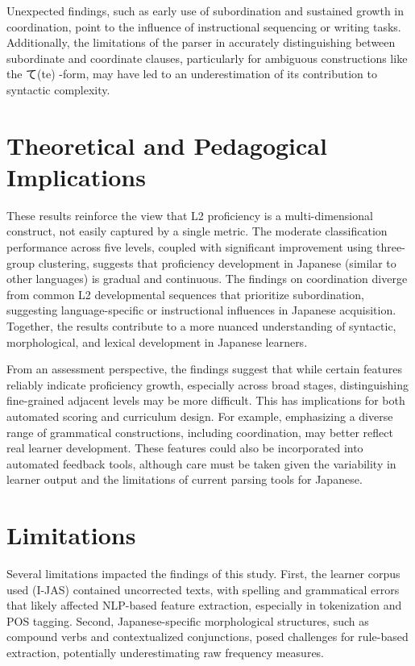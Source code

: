 Unexpected findings, such as early use of subordination and sustained growth in coordination, point to the influence
of instructional sequencing or writing tasks. Additionally, the limitations of the parser in accurately
distinguishing between subordinate and coordinate clauses, particularly for ambiguous constructions like the て(te)
-form,
may have led to an underestimation of its contribution to syntactic complexity.

\section{Theoretical and Pedagogical Implications}
These results reinforce the view that L2 proficiency is a multi-dimensional construct, not easily captured by a single
metric. The moderate classification performance across five levels, coupled with significant improvement using
three-group clustering, suggests that proficiency development in Japanese (similar to other languages) is gradual and
continuous. The findings on coordination diverge from common L2 developmental sequences that prioritize subordination,
suggesting language-specific or instructional influences in Japanese acquisition. Together, the results contribute
to a more nuanced understanding of syntactic, morphological, and lexical development in Japanese learners.

From an assessment perspective, the findings suggest that while certain features reliably indicate proficiency
growth, especially across broad stages, distinguishing fine-grained adjacent levels may be more difficult. This has
implications for both automated scoring and curriculum design. For example, emphasizing a diverse range of
grammatical constructions, including coordination, may better reflect real learner development. These features could
also be incorporated into automated feedback tools, although care must be
taken given the variability in learner
output and the limitations of current parsing tools for Japanese.



\section{Limitations}

Several limitations impacted the findings of this study. First, the learner corpus used (I-JAS) contained uncorrected
texts, with spelling and grammatical errors that likely affected NLP-based feature extraction, especially in
tokenization and POS tagging. Second, Japanese-specific morphological structures, such as compound verbs and
contextualized conjunctions, posed challenges for rule-based extraction, potentially underestimating raw frequency
measures. 

